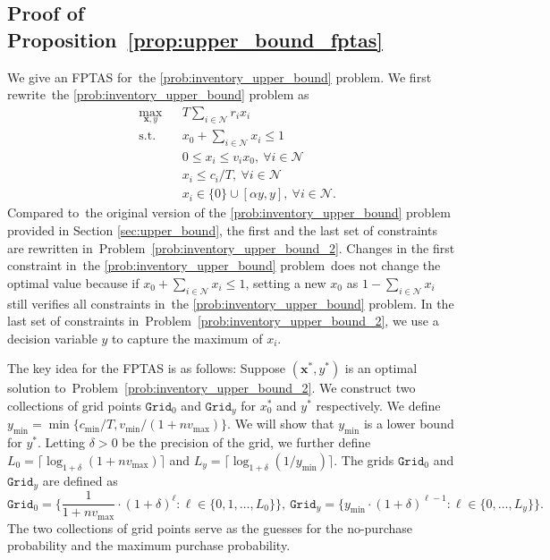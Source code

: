 \documentclass[mnsc,non-blindrev]{informs3}
\theoremstyle{definition}
\begin{document}
\begin{appendices}{\Large{}}
\subsection{Proof of Proposition~\ref{prop:upper_bound_fptas}}\label{sec:prop:upper_bound_fptas}

We give an FPTAS for~the \ref{prob:inventory_upper_bound} problem. We first rewrite~the \ref{prob:inventory_upper_bound} problem as
\begin{equation}\label{prob:inventory_upper_bound_2}
\begin{aligned}
&\max_{\bm{x},y}&&{T\sum_{i\in\mathcal{N}}r_ix_i}\\
&\text{s.t.}&&{x_0+\sum_{i\in\mathcal{N}}x_i\leq1}\\
&&&{0\leq x_i\leq v_ix_0,\ \forall i\in\mathcal{N}}\\
&&&{x_i\leq c_i/T,\ \forall i\in\mathcal{N}}\\
&&&{x_i\in\{0\}\cup[\alpha y,y],\ \forall i\in\mathcal{N}.}
\end{aligned}
\end{equation}
Compared to~the original version of the \ref{prob:inventory_upper_bound} problem provided in Section \ref{sec:upper_bound}, the first and the last set of constraints are rewritten in~Problem~\eqref{prob:inventory_upper_bound_2}. Changes in the first constraint in~the \ref{prob:inventory_upper_bound} problem~does not change the optimal value because if $x_0+\sum_{i\in\mathcal{N}}x_i\leq 1$, setting a new $x_0$ as $1-\sum_{i\in\mathcal{N}}x_i$ still verifies all constraints in~the \ref{prob:inventory_upper_bound} problem. In the last set of constraints in~Problem~\eqref{prob:inventory_upper_bound_2}, we use a decision variable $y$ to capture the maximum of $x_i$.

The key idea for the FPTAS is as follows: Suppose $(\bm{x}^*,y^*)$ is an optimal solution to~Problem~\eqref{prob:inventory_upper_bound_2}. We construct two collections of grid points $\texttt{Grid}_0$ and $\texttt{Grid}_y$ for $x_0^*$ and $y^*$ respectively. We define $y_{\min}=\min\{c_{\min}/T,v_{\min}/(1+nv_{\max})\}$. We will show that $y_{\min}$ is a lower bound for $y^*$. Letting $\delta>0$ be the precision of the grid, we further define $L_0=\lceil\log_{1+\delta}(1+nv_{\max})\rceil$ and \mbox{$L_y=\lceil\log_{1+\delta}(1/y_{\min})\rceil$}. The grids $\texttt{Grid}_0$ and $\texttt{Grid}_y$ are defined as
\begin{equation*}
\texttt{Grid}_0=\Big\{\dfrac{1}{1+nv_{\max}}\cdot(1+\delta)^{\ell}:\ell\in\{0,1,\dots,L_0\}\Big\},\ \texttt{Grid}_y=\Big\{y_{\min}\cdot(1+\delta)^{\ell-1}:\ell\in\{0,\dots,L_y\}\Big\}.
\end{equation*}
The two collections of grid points serve as the guesses for the no-purchase probability and the maximum purchase probability.


\end{appendices}
\end{document}
